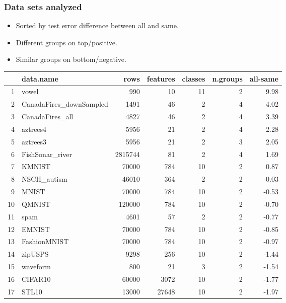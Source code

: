 \documentclass{beamer}
\begin{document}
\begin{frame}
  \frametitle{Data sets analyzed}
  \begin{itemize}
  \item Sorted by test error difference between all and same.
  \item Different groups on top/positive.
  \item Similar groups on bottom/negative.
  \end{itemize}
  \scriptsize
\begin{tabular}{rlrrrrr}
  \hline
 & data.name & rows & features & classes & n.groups & all-same \\ 
  \hline
1 & vowel & 990 &  10 &  11 &   2 & 9.98 \\ 
  2 & CanadaFires\_downSampled & 1491 &  46 &   2 &   4 & 4.02 \\ 
  3 & CanadaFires\_all & 4827 &  46 &   2 &   4 & 3.39 \\ 
  4 & aztrees4 & 5956 &  21 &   2 &   4 & 2.28 \\ 
  5 & aztrees3 & 5956 &  21 &   2 &   3 & 2.05 \\ 
  6 & FishSonar\_river & 2815744 &  81 &   2 &   4 & 1.69 \\ 
  7 & KMNIST & 70000 & 784 &  10 &   2 & 0.87 \\
  \hline
  8 & NSCH\_autism & 46010 & 364 &   2 &   2 & -0.03 \\ 
  9 & MNIST & 70000 & 784 &  10 &   2 & -0.53 \\ 
  10 & QMNIST & 120000 & 784 &  10 &   2 & -0.70 \\ 
  11 & spam & 4601 &  57 &   2 &   2 & -0.77 \\ 
  12 & EMNIST & 70000 & 784 &  10 &   2 & -0.85 \\ 
  13 & FashionMNIST & 70000 & 784 &  10 &   2 & -0.97 \\ 
  14 & zipUSPS & 9298 & 256 &  10 &   2 & -1.44 \\ 
  15 & waveform & 800 &  21 &   3 &   2 & -1.54 \\ 
  16 & CIFAR10 & 60000 & 3072 &  10 &   2 & -1.77 \\ 
  17 & STL10 & 13000 & 27648 &  10 &   2 & -1.97 \\ 
   \hline
\end{tabular}

\end{frame}
\end{document}
